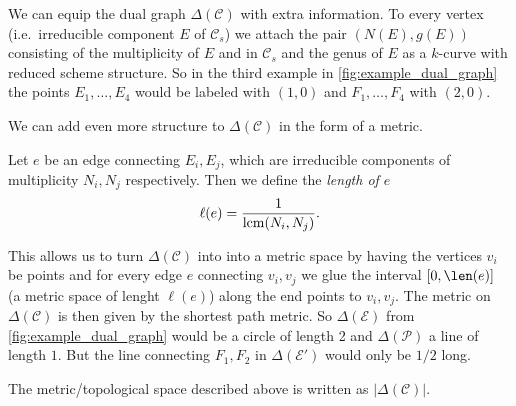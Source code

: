 We can equip the dual graph $\Delta(\mathscr C) $ with extra information. 
To every vertex (i.e.\ irreducible component  $E$ of $\mathscr C_s$) we attach the pair $(N(E), g(E))$ consisting of the multiplicity of $E$ and in $\mathscr C_s$ and the genus of $E$ as a $k$-curve with reduced scheme structure. 
So in the third example in \cref{fig:example_dual_graph} the points $E_1, \ldots, E_4$ would be labeled with $(1, 0)$ and $F_1, \ldots, F_4$ with $(2, 0)$. 

We can add even more structure to $\Delta(\mathscr C)$ in the form of a metric. 
\begin{definition}
Let $e$ be an edge connecting $E_i, E_j$, which are irreducible components of multiplicity $N_i, N_j$ respectively. 
Then we define the \emph{length of $e$ }  \[
	\ell(e) = \frac{1}{\operatorname{lcm} (N_i, N_j)}
.\] 
\end{definition}

This allows us to turn $\Delta(\mathscr C)$ into into a metric space by having the vertices $v_i$ be points and for every edge  $e$ connecting $v_i, v_j$ we glue the interval $[0, \len(e)]$ (a metric space of lenght $\ell(e)$) along the end points to $v_i, v_j$. 
The metric on $\Delta(\mathscr C)$ is then given by the shortest path metric. 
So $\Delta(\mathscr E )$ from \cref{fig:example_dual_graph} would be a circle of length 2 and $\Delta (\mathscr P)$ a line of length $1$. 
But the line connecting $F_1, F_2$ in $\Delta(\mathscr E')$ would only be $1 /2$ long. 
\begin{definition}
	The metric/topological space described above is written as $|\Delta(\mathscr C)|$. 
\end{definition}

